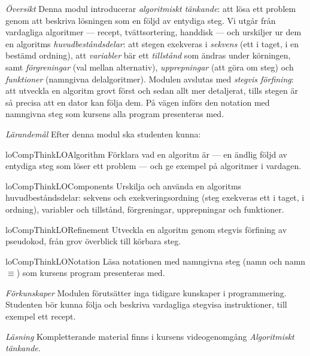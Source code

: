 \emph{Översikt}
Denna modul introducerar \emph{algoritmiskt tänkande}: att lösa ett problem
genom att beskriva lösningen som en följd av entydiga steg.  Vi utgår från
vardagliga algoritmer --- recept, tvättsortering, handdisk --- och urskiljer
ur dem en algoritms \emph{huvudbeståndsdelar}: att stegen exekveras i
\emph{sekvens} (ett i taget, i en bestämd ordning), att \emph{variabler} bär
ett \emph{tillstånd} som ändras under körningen, samt \emph{förgreningar}
(val mellan alternativ), \emph{upprepningar} (att göra om steg) och
\emph{funktioner} (namngivna delalgoritmer).  Modulen avslutas med
\emph{stegvis förfining}: att utveckla en algoritm grovt först och sedan allt
mer detaljerat, tills stegen är så precisa att en dator kan följa dem.  På
vägen införs den notation med namngivna steg som kursens alla program
presenteras med.

\emph{Lärandemål}
Efter denna modul ska studenten kunna:
\begin{restatable}{lo}{CompThinkLOAlgorithm}\label{CompThinkLOAlgorithm}%
  Förklara vad en algoritm är --- en ändlig följd av entydiga steg som löser
  ett problem --- och ge exempel på algoritmer i vardagen.
\end{restatable}
\begin{restatable}{lo}{CompThinkLOComponents}\label{CompThinkLOComponents}%
  Urskilja och använda en algoritms huvudbeståndsdelar: sekvens och
  exekveringsordning (steg exekveras ett i taget, i ordning), variabler
  och tillstånd, förgreningar, upprepningar och funktioner.
\end{restatable}
\begin{restatable}{lo}{CompThinkLORefinement}\label{CompThinkLORefinement}%
  Utveckla en algoritm genom stegvis förfining av pseudokod, från grov
  överblick till körbara steg.
\end{restatable}
\begin{restatable}{lo}{CompThinkLONotation}\label{CompThinkLONotation}%
  Läsa notationen med namngivna steg (\LA{}namn\RA{} och
  \LA{}namn\RA{}\(\equiv\)) som kursens program presenteras med.
\end{restatable}

\emph{Förkunskaper}
Modulen förutsätter inga tidigare kunskaper i programmering.  Studenten bör
kunna följa och beskriva vardagliga stegvisa instruktioner, till exempel ett
recept.

\emph{Läsning}
Kompletterande material finns i kursens videogenomgång \emph{Algoritmiskt
tänkande}.
